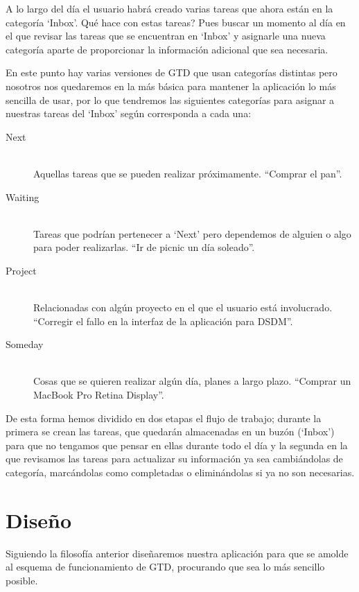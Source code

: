 \documentclass[parskip=half*]{scrartcl}
\begin{document}
A lo largo del d\'ia el usuario habr\'a creado varias tareas que ahora est\'an en la categor\'ia `Inbox'. \textquestiondown Qu\'e hace con estas tareas? Pues buscar un momento al d\'ia en el que revisar las tareas que se encuentran en `Inbox' y asignarle una nueva categor\'ia aparte de proporcionar la informaci\'on adicional que sea necesaria.

En este punto hay varias versiones de GTD que usan categor\'ias distintas pero nosotros nos quedaremos en la m\'as b\'asica para mantener la aplicaci\'on lo m\'as sencilla de usar, por lo que tendremos las siguientes categor\'ias para asignar a nuestras tareas del `Inbox' seg\'un corresponda a cada una:

\begin{description}
	\item[Next] \hfill \\ Aquellas tareas que se pueden realizar pr\'oximamente. ``Comprar el pan''.
	\item[Waiting] \hfill \\ Tareas que podr\'ian pertenecer a `Next' pero dependemos de alguien o algo para poder realizarlas. ``Ir de picnic un d\'ia soleado''.
	\item[Project] \hfill \\ Relacionadas con alg\'un proyecto en el que el usuario est\'a involucrado. ``Corregir el fallo en la interfaz de la aplicaci\'on para DSDM''.
	\item[Someday] \hfill \\ Cosas que se quieren realizar alg\'un d\'ia, planes a largo plazo. ``Comprar un MacBook Pro Retina Display''.
\end{description}

De esta forma hemos dividido en dos etapas el flujo de trabajo; durante la primera se crean las tareas, que quedar\'an almacenadas en un buz\'on (`Inbox') para que no tengamos que pensar en ellas durante todo el d\'ia y la segunda en la que revisamos las tareas para actualizar su informaci\'on ya sea cambi\'andolas de categor\'ia, marc\'andolas como completadas o elimin\'andolas si ya no son necesarias.

\section{Dise\~no}

Siguiendo la filosof\'ia anterior dise\~naremos nuestra aplicaci\'on para que se amolde al esquema de funcionamiento de GTD, procurando que sea lo m\'as sencillo posible.
\end{document}
